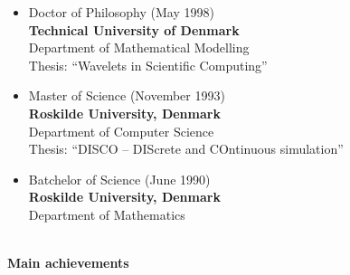 \documentclass[11pt,a4paper]{article}
\begin{document}
\begin{itemize}
\item Doctor of Philosophy (May 1998) \\
{\bf Technical University of Denmark} \\
Department of Mathematical Modelling  \\
Thesis: ``Wavelets in Scientific Computing''\\

\item  Master of Science (November 1993) \\
{\bf Roskilde University, Denmark} \\
Department of Computer Science \\
Thesis: ``DISCO -- DIScrete and COntinuous simulation''\\

\item  Batchelor of Science (June 1990) \\
{\bf Roskilde University, Denmark} \\
Department of Mathematics \\
\end{itemize}


\pagebreak

\begin{center}
  \hrulefill \\
  {\bf Main achievements} \\[-0.2cm]
  \hrulefill
\end{center}
\end{document}

